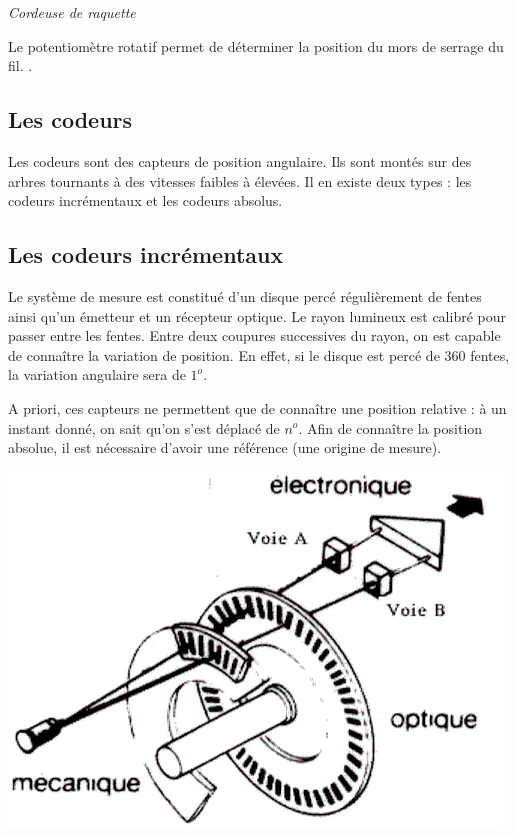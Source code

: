 \documentclass[10pt]{article}
\begin{document}
\begin{exemple}
\textit{Cordeuse de raquette}

Le potentiomètre rotatif permet de déterminer la position du mors de serrage du fil. .
\end{exemple}

\subsection{Les codeurs}
Les codeurs sont des capteurs de position angulaire. Ils sont montés sur des arbres tournants à des vitesses faibles à élevées. Il en existe deux types : les codeurs incrémentaux et les codeurs absolus.

\subsection{Les codeurs incrémentaux}

\begin{minipage}[c]{.6\linewidth}
Le système de mesure est constitué d'un disque percé régulièrement de fentes ainsi qu'un émetteur et un récepteur optique. Le rayon lumineux est calibré pour passer entre les fentes. Entre deux coupures successives du rayon, on est capable de connaître la variation de position. 
En effet, si le disque est percé de 360 fentes, la variation angulaire sera de $1^o$.

A priori, ces capteurs ne permettent que de connaître une position relative : à un instant donné, on sait qu'on s'est déplacé de $n^o$. Afin de connaître la position absolue, il est nécessaire d'avoir une référence (une origine de mesure). 
\end{minipage}\hfill
\begin{minipage}[c]{.35\linewidth}
\begin{center}
    \includegraphics[width=.9\textwidth]{images/codeur_inc.png}
\end{center}
\end{minipage}
\end{document}
